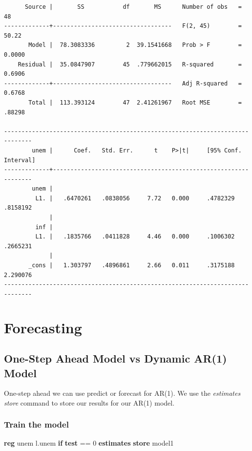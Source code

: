 \documentclass[
]{book}
\newenvironment{Shaded}{\begin{snugshade}}{\end{snugshade}}
\newcommand{\KeywordTok}[1]{\textcolor[rgb]{0.13,0.29,0.53}{\textbf{#1}}}
\newcommand{\NormalTok}[1]{#1}
\newcommand{\OtherTok}[1]{\textcolor[rgb]{0.56,0.35,0.01}{#1}}
\begin{document}
\begin{verbatim}
      Source |       SS           df       MS      Number of obs   =        48
-------------+----------------------------------   F(2, 45)        =     50.22
       Model |  78.3083336         2  39.1541668   Prob > F        =    0.0000
    Residual |  35.0847907        45  .779662015   R-squared       =    0.6906
-------------+----------------------------------   Adj R-squared   =    0.6768
       Total |  113.393124        47  2.41261967   Root MSE        =    .88298

------------------------------------------------------------------------------
        unem |      Coef.   Std. Err.      t    P>|t|     [95% Conf. Interval]
-------------+----------------------------------------------------------------
        unem |
         L1. |   .6470261   .0838056     7.72   0.000     .4782329    .8158192
             |
         inf |
         L1. |   .1835766   .0411828     4.46   0.000     .1006302    .2665231
             |
       _cons |   1.303797   .4896861     2.66   0.011     .3175188    2.290076
------------------------------------------------------------------------------
\end{verbatim}

\chapter{Forecasting}\label{forecasting}

\section{One-Step Ahead Model vs Dynamic AR(1) Model}\label{one-step-ahead-model-vs-dynamic-ar1-model}

One-step ahead we can use predict or forecast for AR(1). We use the \emph{estimates store} command to store our results for our AR(1) model.

\subsection*{Train the model}\label{train-the-model}

\begin{Shaded}
\begin{Highlighting}[]
\KeywordTok{reg}\NormalTok{ unem }\OtherTok{l}\NormalTok{.unem }\KeywordTok{if} \KeywordTok{test}\NormalTok{ == 0}
\KeywordTok{estimates} \KeywordTok{store}\NormalTok{ model1}
\end{Highlighting}
\end{Shaded}
\end{document}
